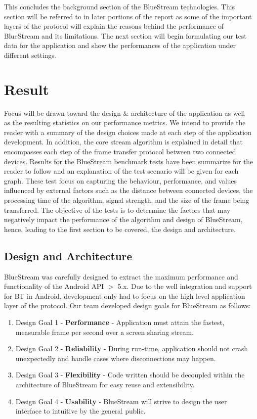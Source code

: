 \documentclass[a4paper,12pt]{article}
\begin{document}
This concludes the background section of the BlueStream technologies. This section will be referred to in later portions of the report as some of the important layers of the protocol will explain the reasons behind the performance of BlueStream and its limitations. The next section will begin formulating our test data for the application and show the performances of the application under different settings.

\section{Result}
Focus will be drawn toward the design \& architecture of the application as well as the resulting statistics on our performance metrics. We intend to provide the reader with a summary of the design choices made at each step of the application development. In addition, the core stream algorithm is explained in detail that encompasses each step of the frame transfer protocol between two connected devices. Results for the BlueStream benchmark tests have been summarize for the reader to follow and an explanation of the test scenario will be given for each graph. These test focus on capturing the behaviour, performance, and values influenced by external factors such as the distance between connected devices, the processing time of the algorithm, signal strength, and the size of the frame being transferred. The objective of the tests is to determine the factors that may negatively impact the performance of the algorithm and design of BlueStream, hence, leading to the first section to be covered, the design and architecture.

\subsection{Design and Architecture}
BlueStream was carefully designed to extract the maximum performance and functionality of the Android API $>$ 5.x. Due to the well integration and support for BT in Android, development only had to focus on the high level application layer of the protocol. Our team developed design goals for BlueStream as follows:

\begin{enumerate}
\item Design Goal 1 - \textbf{Performance} - Application must attain the fastest, measurable frame per second over a screen sharing stream. 
\item Design Goal 2 - \textbf{Reliability} - During run-time, application should not crash unexpectedly and handle cases where disconnections may happen. 
\item Design Goal 3 - \textbf{Flexibility} - Code written should be decoupled within the architecture of BlueStream for easy reuse and extensibility.
\item Design Goal 4 - \textbf{Usability} -  BlueStream will strive to design the user interface to intuitive by the general public.
\end{enumerate}
\end{document}
